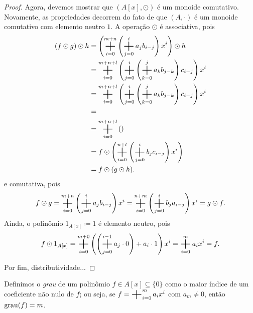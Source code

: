 \begin{proof}
	Agora, devemos mostrar que $(A[x],\odot)$ é um monoide comutativo. Novamente, as propriedades decorrem do fato de que $(A,\cdot)$ é um monoide comutativo com elemento neutro $1$. A operação $\odot$ é associativa, pois
	\begin{equation*}
	\begin{split}
	(f \odot g) \odot h &= \left( \bigsum_{i=0}^{m+n} \left(\bigsum_{j=0}^i a_jb_{i-j}\right)x^i \right) \odot h \\
		&= \bigsum_{i=0}^{m+n+l} \left( \bigsum_{j=0}^{i}\left(\bigsum_{k=0}^j a_kb_{j-k}\right)c_{i-j}\right)x^i \\
		&= \bigsum_{i=0}^{m+n+l} \left( \bigsum_{j=0}^{i}\left(\bigsum_{k=0}^j a_kb_{j-k}\right)c_{i-j}\right)x^i \\
		&= \\
		&= \bigsum_{i=0}^{m+n+l} \left( \right) \\
		&= f \odot \left( \bigsum_{i=0}^{n+l} \left(\bigsum_{j=0}^i b_jc_{i-j}\right)x^i \right) \\
		&= f \odot (g \odot h).
	 \end{split}
	 \end{equation*}
e comutativa, pois
	\begin{equation*}
	f \odot g = \bigsum_{i=0}^{m+n} \left(\bigsum_{j=0}^i a_jb_{i-j}\right)x^i = \bigsum_{i=0}^{n+m} \left(\bigsum_{j=0}^i b_ja_{i-j}\right)x^i = g \odot f.
	 \end{equation*}
Ainda, o polinômio $1_{A[x]} \coloneqq 1$ é elemento neutro, pois
	\begin{equation*}
	f \odot 1_{A[x]} = \bigsum_{i=0}^{m+0} \left(\left(\bigsum_{j=0}^{i-1} a_j \cdot 0 \right) + a_i \cdot 1\right)x^i = \bigsum_{i=0}^m a_ix^i = f.
	 \end{equation*}

	 Por fim, distributividade...
\end{proof}

\begin{defi}
	Definimos o \emph{grau} de um polinômio $f \in A[x] \subseteq \{0\}$ como o maior índice de um coeficiente não nulo de $f$; ou seja, se $f=\bigsum_{i=0}^m a_ix^i$ com $a_m \neq 0$, então $\operatorname{grau}(f)=m$.
\end{defi}


